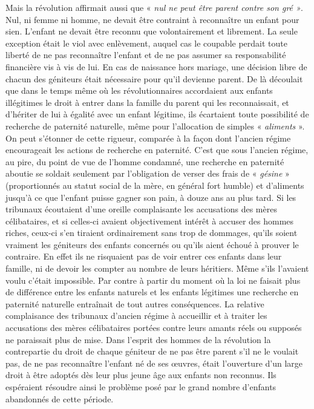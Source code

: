  Mais la révolution affirmait aussi que « \emph{nul ne peut être parent contre son gré »}. Nul, ni femme ni homme, ne devait être contraint à reconnaître un enfant pour sien. L'enfant ne devait être reconnu que volontairement et librement. La seule exception était le viol avec enlèvement, auquel cas le coupable perdait toute liberté de ne pas reconnaître l'enfant et de ne pas assumer sa responsabilité financière vis à vis de lui. En cas de naissance hors mariage, une décision libre de chacun des géniteurs était nécessaire pour qu'il devienne parent. 
 De là découlait que dans le temps même où les révolutionnaires accordaient aux enfants illégitimes le droit à entrer dans la famille du parent qui les reconnaissait, et d'hériter de lui à égalité avec un enfant légitime, ils écartaient toute possibilité de recherche de paternité naturelle, même pour l'allocation de simples « \emph{aliments} ». 
 On peut s'étonner de cette rigueur, comparée à la façon dont l'ancien régime encourageait les actions de recherche en paternité. C'est que sous l'ancien régime, au pire, du point de vue de l'homme condamné, une recherche en paternité aboutie se soldait seulement par l'obligation de verser des frais de « \emph{gésine} » (proportionnés au statut social de la mère, en général fort humble) et d'aliments jusqu'à ce que l'enfant puisse gagner son pain, à douze ans au plus tard. Si les tribunaux écoutaient d'une oreille complaisante les accusations des mères célibataires, et si celles-ci avaient objectivement intérêt à accuser des hommes riches, ceux-ci s'en tiraient ordinairement sans trop de dommages, qu'ils soient vraiment les géniteurs des enfants concernés ou qu'ils aient échoué à prouver le contraire. En effet ils ne risquaient pas de voir entrer ces enfants dans leur famille, ni de devoir les compter au nombre de leurs héritiers. Même s'ils l'avaient voulu c'était impossible. Par contre à partir du moment où la loi ne faisait plus de différence entre les enfants naturels et les enfants légitimes une recherche en paternité naturelle entraînait de tout autres conséquences. La relative complaisance des tribunaux d'ancien régime à accueillir et à traiter les accusations des mères célibataires portées contre leurs amants réels ou supposés ne paraissait plus de mise. 
 Dans l'esprit des hommes de la révolution la contrepartie du droit de chaque géniteur de ne pas être parent s'il ne le voulait pas, de ne pas reconnaître l'enfant né de ses œuvres, était l'ouverture d'un large droit à être adoptés dès leur plus jeune âge aux enfants non reconnus. Ils espéraient résoudre ainsi le problème posé par le grand nombre d'enfants abandonnés de cette période. 

